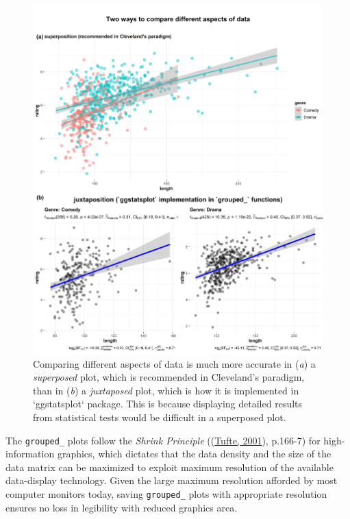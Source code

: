 \documentclass[
]{article}
\begin{document}
\begin{figure}[H]
\includegraphics[width=1\linewidth]{./figures/paper-fig3-1} \caption{Comparing different aspects of data is much more accurate in (\textit{a}) a \textit{superposed} plot, which is recommended in Cleveland's paradigm, than in (\textit{b}) a \textit{juxtaposed} plot, which is how it is implemented in `ggstatsplot` package. This is because displaying detailed results from statistical tests would be difficult in a superposed plot.}\label{fig:fig3}
\end{figure}

The \texttt{grouped\_} plots follow the \emph{Shrink Principle}
((\protect\hyperlink{ref-tufteVisualDisplayQuantitative2001}{Tufte, 2001}), p.166-7) for high-information graphics,
which dictates that the data density and the size of the data matrix can be
maximized to exploit maximum resolution of the available data-display
technology. Given the large maximum resolution afforded by most computer
monitors today, saving \texttt{grouped\_} plots with appropriate resolution ensures no
loss in legibility with reduced graphics area.
\end{document}
